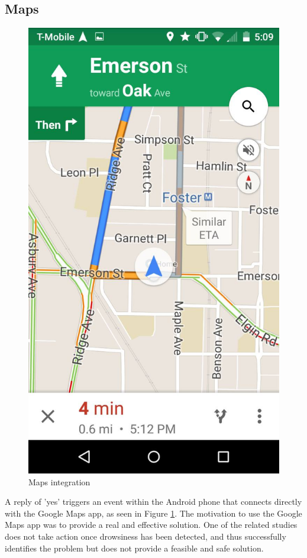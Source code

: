 \documentclass[twocolumn]{article}
\begin{document}
\subsection{Maps}
\begin{figure}[H]
\centering
  \includegraphics[width=.5\linewidth]{load_map.jpg}
  \caption{Maps integration}
  \label{fig:map}
\end{figure}

A reply of 'yes' triggers an event within the Android phone that connects directly with the Google Maps app, as seen in Figure \ref{fig:map}. The motivation to use the Google Maps app was to provide a real and effective solution. One of the related studies \cite{pakistan} does not take action once drowsiness has been detected, and thus successfully identifies the problem but does not provide a feasible and safe solution. 
\end{document}
